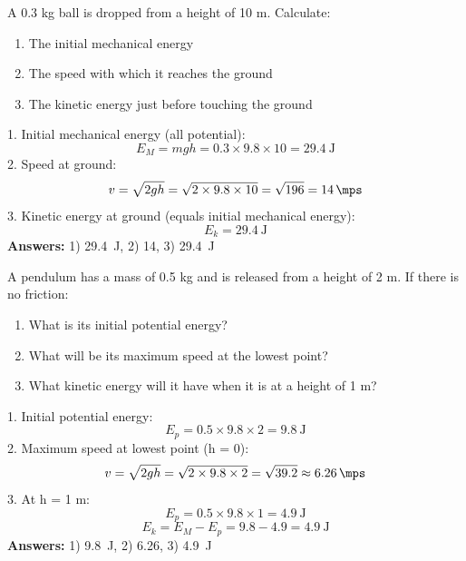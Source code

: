 \begin{exercise}
    A 0.3 kg ball is dropped from a height of 10 m. Calculate:
    \begin{enumerate}
        \item The initial mechanical energy
        \item The speed with which it reaches the ground
        \item The kinetic energy just before touching the ground
    \end{enumerate}
    \begin{solu}
        1. Initial mechanical energy (all potential):
        \[
            E_M = mgh = 0.3 \times 9.8 \times 10 = \qty{29.4}{\joule}
        \]
        2. Speed at ground:
        \[
            v = \sqrt{2gh} = \sqrt{2 \times 9.8 \times 10} = \sqrt{196} = \qty{14}{\mps}
        \]
        3. Kinetic energy at ground (equals initial mechanical energy):
        \[
            E_k = \qty{29.4}{\joule}
        \]
        \textbf{Answers:} 1) \qty{29.4}{\joule}, 2) \qty{14}{\mps}, 3) \qty{29.4}{\joule}
    \end{solu}
\end{exercise}

\begin{exercise}
    A pendulum has a mass of 0.5 kg and is released from a height of 2 m. If there is no friction:
    \begin{enumerate}
        \item What is its initial potential energy?
        \item What will be its maximum speed at the lowest point?
        \item What kinetic energy will it have when it is at a height of 1 m?
    \end{enumerate}
    \begin{solu}
        1. Initial potential energy:
        \[
            E_p = 0.5 \times 9.8 \times 2 = \qty{9.8}{\joule}
        \]
        2. Maximum speed at lowest point (h = 0):
        \[
            v = \sqrt{2gh} = \sqrt{2 \times 9.8 \times 2} = \sqrt{39.2} \approx \qty{6.26}{\mps}
        \]
        3. At h = 1 m:
        \[
            E_p = 0.5 \times 9.8 \times 1 = \qty{4.9}{\joule}
        \]
        \[
            E_k = E_M - E_p = 9.8 - 4.9 = \qty{4.9}{\joule}
        \]
        \textbf{Answers:} 1) \qty{9.8}{\joule}, 2) \qty{6.26}{\mps}, 3) \qty{4.9}{\joule}
    \end{solu}
\end{exercise}

